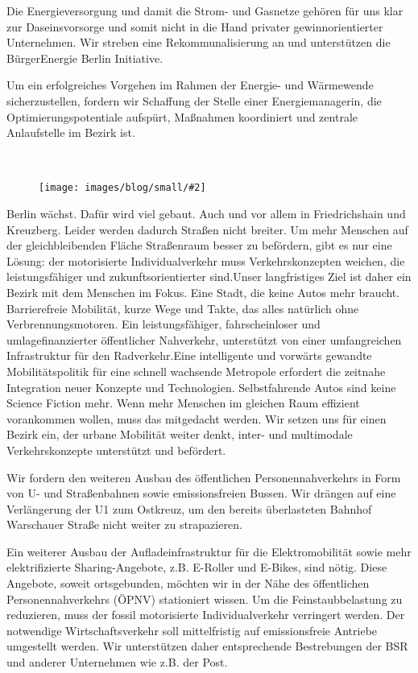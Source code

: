 \documentclass[a4paper,10pt]{article}
\newcommand{\mysection}[1]{{\vspace{1cm}\noindent\color{gray}{\ttfamily\LARGE\raggedright #1}\\\medskip}}
\newcommand{\abschnitt}[2]{%
\mysection{\raggedright #1}%
\begin{figure}[t]%
\vspace*{-2.7cm}%
\hspace*{-2.1cm}%
\texttt{[image: images/blog/small/\#2]} %
\end{figure}%
}
\begin{document}
Die Energieversorgung und damit die Strom- und Gasnetze gehören für uns
klar zur Daseinsvorsorge und somit nicht in die Hand privater
gewinnorientierter Unternehmen. Wir streben eine Rekommunalisierung an
und unterstützen die BürgerEnergie Berlin Initiative.

Um ein erfolgreiches Vorgehen im Rahmen der Energie- und Wärmewende
sicherzustellen, fordern wir Schaffung der Stelle einer
Energiemanagerin, die Optimierungspotentiale aufspürt, Maßnahmen
koordiniert und zentrale Anlaufstelle im Bezirk ist.

\clearpage
\abschnitt{Verkehr}{GefahrengebietA100}

Berlin wächst. Dafür wird viel gebaut. Auch und vor allem in
Friedrichshain und Kreuzberg. Leider werden dadurch Straßen nicht
breiter. Um mehr Menschen auf der gleichbleibenden Fläche Straßenraum
besser zu befördern, gibt es nur eine Lösung: der motorisierte
Individualverkehr muss Verkehrskonzepten weichen, die leistungsfähiger
und zukunftsorientierter sind.Unser langfristiges Ziel ist daher ein
Bezirk mit dem Menschen im Fokus. Eine Stadt, die keine Autos mehr
braucht. Barrierefreie Mobilität, kurze Wege und Takte, das alles
natürlich ohne Verbrennungsmotoren. Ein leistungsfähiger,
fahrscheinloser und umlagefinanzierter öffentlicher Nahverkehr,
unterstützt von einer umfangreichen Infrastruktur für den
Radverkehr.Eine intelligente und vorwärts gewandte Mobilitätspolitik für
eine schnell wachsende Metropole erfordert die zeitnahe Integration
neuer Konzepte und Technologien. Selbstfahrende Autos sind keine Science
Fiction mehr. Wenn mehr Menschen im gleichen Raum effizient vorankommen
wollen, muss das mitgedacht werden. Wir setzen uns für einen Bezirk ein,
der urbane Mobilität weiter denkt, inter- und multimodale
Verkehrskonzepte unterstützt und befördert.

Wir fordern den weiteren Ausbau des öffentlichen Personennahverkehrs in
Form von U- und Straßenbahnen sowie emissionsfreien Bussen. Wir drängen
auf eine Verlängerung der U1 zum Ostkreuz, um den bereits überlasteten
Bahnhof Warschauer Straße nicht weiter zu strapazieren.

Ein weiterer Ausbau der Aufladeinfrastruktur für die Elektromobilität
sowie mehr elektrifizierte Sharing-Angebote, z.B. E-Roller und E-Bikes,
sind nötig. Diese Angebote, soweit ortsgebunden, möchten wir in der Nähe
des öffentlichen Personennahverkehrs (ÖPNV) stationiert wissen. Um die
Feinstaubbelastung zu reduzieren, muss der fossil motorisierte
Individualverkehr verringert werden. Der notwendige Wirtschaftsverkehr
soll mittelfristig auf emissionsfreie Antriebe umgestellt werden. Wir
unterstützen daher entsprechende Bestrebungen der BSR und anderer
Unternehmen wie z.B. der Post.
\end{document}
